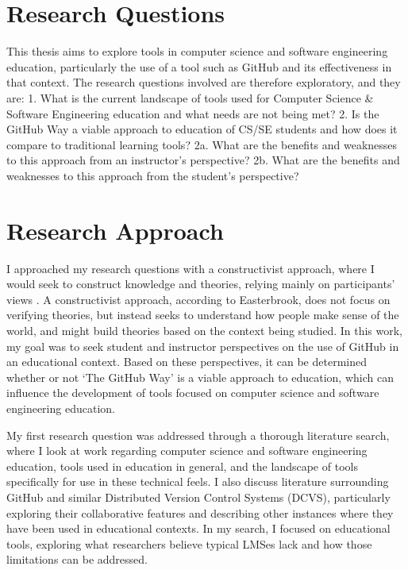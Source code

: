 
\section{Research Questions}
This thesis aims to explore tools in computer science and software engineering education, particularly the use of a tool such as GitHub and its effectiveness in that context. The research questions involved are therefore exploratory, and they are:
1. What is the current landscape of tools used for Computer Science \& Software Engineering education and what needs are not being met?
2. Is the GitHub Way a viable approach to education of CS/SE students and how does it compare to traditional learning tools?
2a. What are the benefits and weaknesses to this approach from an instructor's perspective?
2b. What are the benefits and weaknesses to this approach from the student's perspective?

\section{Research Approach}
I approached my research questions with a constructivist approach, where I would seek to construct knowledge and theories, relying mainly on participants' views \cite{easterbrook2008selecting}. A constructivist approach, according to Easterbrook, does not focus on verifying theories, but instead seeks to understand how people make sense of the world, and might build theories based on the context being studied. In this work, my goal was to seek student and instructor perspectives on the use of GitHub in an educational context. Based on these perspectives, it can be determined whether or not `The GitHub Way' is a viable approach to education, which can influence the development of tools focused on computer science and software engineering education.


My first research question was addressed through a thorough literature search, where I look at work regarding computer science and software engineering education, tools used in education in general, and the landscape of tools specifically for use in these technical feels. I also discuss literature surrounding GitHub and similar Distributed Version Control Systems (DCVS), particularly exploring their collaborative features and describing other instances where they have been used in educational contexts. In my search, I focused on educational tools, exploring what researchers believe typical LMSes lack and how those limitations can be addressed.


